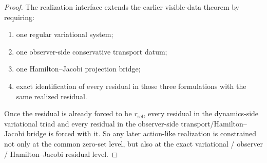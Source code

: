 \begin{proof}
The realization interface extends the earlier visible-data theorem by requiring:
\begin{enumerate}
\item one regular variational system;
\item one observer-side conservative transport datum;
\item one Hamilton--Jacobi projection bridge;
\item exact identification of every residual in those three formulations with the
      same realized residual.
\end{enumerate}
Once the residual is already forced to be \(r_{\mathrm{sel}}\), every
residual in the dynamics-side variational triad and every residual in the
observer-side transport/Hamilton--Jacobi bridge is forced with it. So any
later action-like realization is constrained not only at the common
zero-set level, but also at the exact variational / observer / Hamilton--Jacobi
residual level.
\end{proof}

